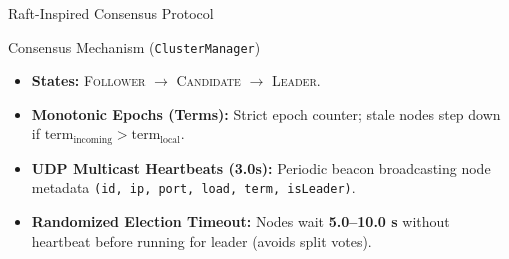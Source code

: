\documentclass[aspectratio=169, 10pt]{beamer}
\begin{document}
\begin{frame}{Raft-Inspired Consensus Protocol}
    \begin{block}{Consensus Mechanism (\texttt{ClusterManager})}
        \begin{itemize}
            \item \textbf{States:} \textsc{Follower} $\to$ \textsc{Candidate} $\to$ \textsc{Leader}.
            \item \textbf{Monotonic Epochs (Terms):} Strict epoch counter; stale nodes step down if $\text{term}_{\text{incoming}} > \text{term}_{\text{local}}$.
            \item \textbf{UDP Multicast Heartbeats (3.0s):} Periodic beacon broadcasting node metadata \texttt{(id, ip, port, load, term, isLeader)}.
            \item \textbf{Randomized Election Timeout:} Nodes wait \textbf{5.0--10.0 s} without heartbeat before running for leader (avoids split votes).
        \end{itemize}
    \end{block}
\end{frame}
\end{document}
